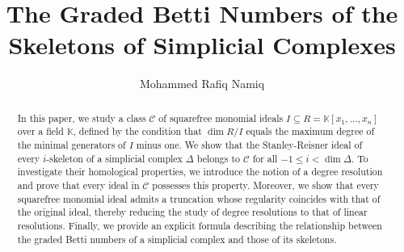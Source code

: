 \documentclass[a4paper,12pt]{amsart}
\title{The Graded Betti Numbers of the Skeletons of Simplicial Complexes}
\date{%
}
\author{Mohammed Rafiq Namiq}
\numberwithin{equation}{section}
\theoremstyle{definition}
\newcommand{\K}[0]{\mathbb{K}}
\begin{document}
	
\begingroup
\def\uppercasenonmath#1{} %
\let\MakeUppercase\relax %
\maketitle
\endgroup

\begin{abstract}
	In this paper, we study a class $\mathcal{C}$ of squarefree monomial ideals $I\subseteq R=\K[x_1,\dots,x_n]$ over a field $\K$, defined by the condition that $\dim R/I$ equals the maximum degree of the minimal generators of $I$ minus one. We show that the Stanley-Reisner ideal of every $i$-skeleton of a simplicial complex $\Delta$ belongs to $\mathcal{C}$ for all $-1\le i<\dim\Delta$. To investigate their homological properties, we introduce the notion of a degree resolution and prove that every ideal in $\mathcal{C}$  possesses this property. Moreover, we show that every squarefree monomial ideal admits a truncation whose regularity coincides with that of the original ideal, thereby reducing the study of degree resolutions to that of linear resolutions. Finally, we provide an explicit formula describing the relationship between the graded Betti numbers of a simplicial complex and those of its skeletons.
	
	


	

\end{abstract}
\end{document}
